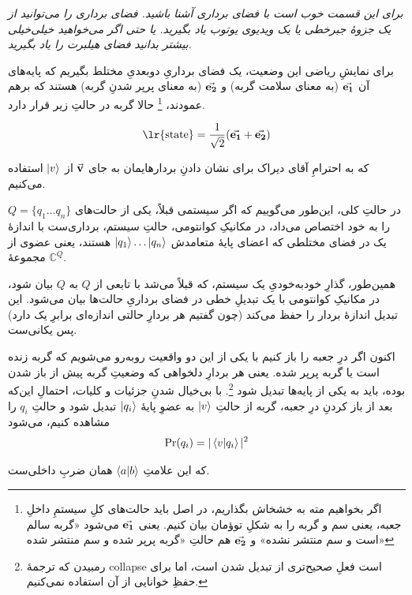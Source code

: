\documentclass[11pt]{article}
\begin{document}
\begin{center}
\begin{minipage}[H]{0.6\textwidth}
\emph{
برای این قسمت خوب است با فضای برداری آشنا باشید. فضای برداری را می‌توانید از یک جزوهٔ جبرخطی یا یک ویدیوی یوتوب یاد بگیرید. یا حتی اگر می‌خواهید خیلی‌خیلی بیشتر بدانید فضای هیلبرت را یاد بگیرید.
}
\end{minipage}
\end{center}
\vspace{3mm}

برای نمایشِ ریاضی‌ این وضعیت، یک فضای برداریِ دوبعدیِ مختلط بگیریم که پایه‌های آن 
$\va{e_1}$ (به معنای سلامت گربه) و 
$\va{e_2}$  (به معنای پرپر شدنِ گربه)
 هستند که برهم عمودند، 
\footnote{
اگر بخواهیم مته به خشخاش \footnotemark بگذاریم، در اصل باید حالت‌های کلِ سیستمِ داخلِ جعبه، یعنی سم و گربه را به شکلِ توؤمان بیان کنیم. یعنی 
$\va{e_1}$ می‌شود 
«گربه سالم است و سم منتشر نشده» و 
$\va{e_2}$ هم حالتِ «گربه پرپر شده و سم منتشر شده» }
حالا گربه در حالتِ زیر قرار دارد.

\[ \text{\lr{state}} = \frac{1}{\sqrt{2}} (\va{e_1} + \va{e_2}) \]

که به احترامِ آقای دیراک برای نشان دادنِ بردارهایمان به جای $\va{v}$ از $\ket{v}$ استفاده می‌کنیم.

در حالتِ کلی، این‌طور می‌گوییم که اگر سیستمی قبلاً، یکی از حالت‌های 
$Q = \{ q_1\dots q_n \}$
را به خود اختصاص می‌داد، در مکانیکِ کوانتومی، حالتِ سیستم، برداری‌ست با اندازهٔ یک در فضای مختلطی که اعضای پایهٔ متعامدش
$\ket{q_1}\dots\ket{q_n}$
هستند، یعنی عضوی از مجموعهٔ 
$\mathbb{C}^Q$.

همین‌طور، گذارِ خودبه‌خودیِ یک سیستم، که قبلاً می‌شد با تابعی از $Q$  به $Q$ بیان شود، در مکانیکِ کوانتومی با یک تبدیلِ خطی در فضای برداریِ حالت‌ها بیان می‌شود. این تبدیل اندازهٔ بردار را حفظ می‌کند (چون گفتیم هر بردارِ حالتی اندازه‌ای برابرِ یک دارد) پس یکانی‌ست.

اکنون اگر درِ جعبه را باز کنیم با یکی از این دو واقعیت روبه‌رو می‌شویم که گربه زنده است یا گربه پرپر شده. یعنی هر بردارِ دلخواهی که وضعیتِ گربه پیش از باز شدن بوده، باید به یکی از پایه‌ها تبدیل شود‌
\footnote{رمبیدن که ترجمهٔ collapse است فعلِ صحیح‌تری از تبدیل شدن است،‌ اما برای حفظِ خوانایی از آن استفاده نمی‌کنیم.}. 
با بی‌خیال شدنِ جزئیات و کلیات، احتمالِ این‌که بعد از باز کردنِ درِ جعبه‌، گربه‌ از حالتِ $\ket{v}$ به عضوِ پایهٔ $\ket{q_i}$ تبدیل شود و  حالتِ $q_i$ را مشاهده کنیم، می‌شود
\[ \Pr(q_i) = |\braket{v}{q_i}|^2 \]

که این علامتِ 
$\braket{a}{b}$
 همان ضربِ داخلی‌ست.
\end{document}
